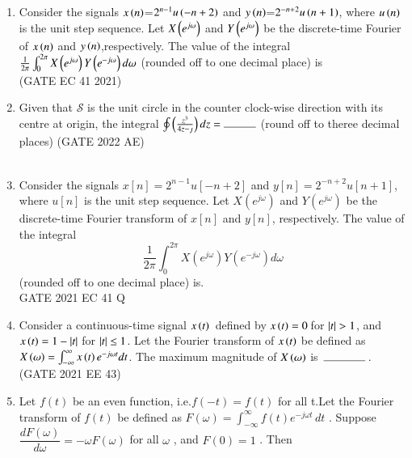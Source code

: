 \begin{enumerate}[label=\thechapter.\arabic*,ref=\thechapter.\theenumi]
\item Consider the signals $x\left(n\right)$=$2^{n-1} u\left( -n+2\right)$ and $y\left(n\right)$=$2^{-n+2}u\left( n+1\right)$, where $u\left(n\right)$ is the unit step sequence. Let $X\left(e^{j\omega}\right)$ and $Y\left(e^{j\omega}\right)$ be the discrete-time Fourier of $x\left(n\right)$ and $y\left(n\right)$,respectively. The value of the integral $\frac{1}{2\pi}\int_{0}^{2\pi} X\left(e^{j\omega}\right) Y\left(e^{-j\omega}\right) d \omega$
(rounded off to one decimal place) is \underline{{\hspace{1.5in}}}\\
\hfill{(GATE EC 41 2021)}\\
\solution

\pagebreak
\item Given that $\mathcal{S}$ is the unit circle in the counter clock-wise direction with its centre at origin, the integral
        $\oint \brak{\frac{z^3}{4z-\jmath}}dz=\rule{1cm}{0.15mm}$
 (round off to theree decimal places)
 \hfill{(GATE 2022 AE)}\\
 \solution\\
 

\item Consider the signals \(x[n] = 2^{n-1} u[-n+2]\) and \(y[n] = 2^{-n+2} u[n+1]\), where \(u[n]\) is the unit step sequence. Let \(X(e^{j\omega})\) and \(Y(e^{j\omega})\) be the discrete-time Fourier transform of \(x[n]\) and \(y[n]\), respectively. The value of the integral
\[
\frac{1}{2\pi} \int_{0}^{2\pi} X(e^{j\omega}) Y(e^{-j\omega}) d\omega
\]
(rounded off to one decimal place) is.\\
\hfill{GATE 2021 EC 41 Q}
\solution

\pagebreak
\item Consider a continuous-time signal $x\left(t\right)$ \,defined by $x\left(t\right)=0$\,for $\left\vert t\right\vert>1$, and $x\left(t\right)=1-\left\vert t\right\vert$ for $\left\vert t\right\vert\le 1$. Let the Fourier transform of $x\left(t\right)$ be defined as $X\left(\omega\right)=\int_{-\infty}^{\infty}x\left(t\right)e^{-j\omega t} dt$. The maximum magnitude of $X\left(\omega\right)$ is $\hbox to 4em{\thinspace\hrulefill\thinspace}$.
\hfill{(GATE 2021 EE 43)}\\
\solution

\pagebreak
\item Let $f(t)$ be an even function, i.e.$f(-t) = f(t)$ for all t.Let the Fourier transform of $f(t)$ be defined as $F(\omega) = \int_{-\infty}^{\infty} f(t) e^{-j \omega t} \, dt $ . Suppose $\dfrac{dF(\omega)}{d \omega} = -\omega F(\omega)$ for all $\omega$ , and $F(0) = 1$ . Then



\end{enumerate}
